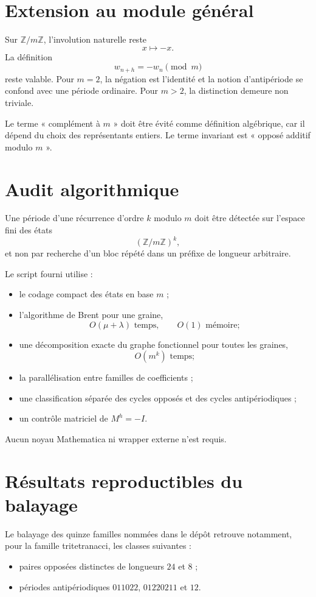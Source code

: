 \documentclass[11pt,a4paper]{article}
\newcommand{\Z}{\mathbb Z}
\begin{document}
\section{Extension au module général}

Sur \(\Z/m\Z\), l'involution naturelle reste
\[
x\longmapsto-x.
\]
La définition
\[
w_{n+h}=-w_n\pmod m
\]
reste valable. Pour \(m=2\), la négation est l'identité et la notion
d'antipériode se confond avec une période ordinaire. Pour \(m>2\), la
distinction demeure non triviale.

Le terme « complément à \(m\) » doit être évité comme définition
algébrique, car il dépend du choix des représentants entiers. Le terme
invariant est « opposé additif modulo \(m\) ».

\section{Audit algorithmique}

Une période d'une récurrence d'ordre \(k\) modulo \(m\) doit être détectée
sur l'espace fini des états
\[
(\Z/m\Z)^k,
\]
et non par recherche d'un bloc répété dans un préfixe de longueur arbitraire.

Le script fourni utilise :
\begin{itemize}
\item le codage compact des états en base \(m\) ;
\item l'algorithme de Brent pour une graine,
\[
O(\mu+\lambda)\text{ temps},\qquad O(1)\text{ mémoire};
\]
\item une décomposition exacte du graphe fonctionnel pour toutes les graines,
\[
O(m^k)\text{ temps};
\]
\item la parallélisation entre familles de coefficients ;
\item une classification séparée des cycles opposés et des cycles
antipériodiques ;
\item un contrôle matriciel de \(M^h=-I\).
\end{itemize}

Aucun noyau Mathematica ni wrapper externe n'est requis.

\section{Résultats reproductibles du balayage}

Le balayage des quinze familles nommées dans le dépôt retrouve notamment,
pour la famille tritetranacci, les classes suivantes :
\begin{itemize}
\item paires opposées distinctes de longueurs \(24\) et \(8\) ;
\item périodes antipériodiques \(011022\), \(01220211\) et \(12\).
\end{itemize}
\end{document}
